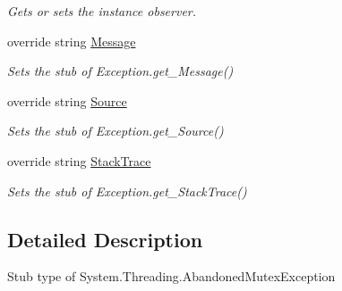 \begin{DoxyCompactItemize}
\begin{DoxyCompactList}\small\item\em Gets or sets the instance observer.\end{DoxyCompactList}\item 
override string \hyperlink{class_system_1_1_threading_1_1_fakes_1_1_stub_abandoned_mutex_exception_a0d5e6637cdb4b44b7f67678c9181e0d9}{Message}
\begin{DoxyCompactList}\small\item\em Sets the stub of Exception.\-get\-\_\-\-Message()\end{DoxyCompactList}\item 
override string \hyperlink{class_system_1_1_threading_1_1_fakes_1_1_stub_abandoned_mutex_exception_ad3befedffe22f6a684db8bb0bca84ba6}{Source}
\begin{DoxyCompactList}\small\item\em Sets the stub of Exception.\-get\-\_\-\-Source()\end{DoxyCompactList}\item 
override string \hyperlink{class_system_1_1_threading_1_1_fakes_1_1_stub_abandoned_mutex_exception_a4ae8f850b38c1ef4a0bccbbe6bbe6155}{Stack\-Trace}
\begin{DoxyCompactList}\small\item\em Sets the stub of Exception.\-get\-\_\-\-Stack\-Trace()\end{DoxyCompactList}\end{DoxyCompactItemize}


\subsection{Detailed Description}
Stub type of System.\-Threading.\-Abandoned\-Mutex\-Exception



